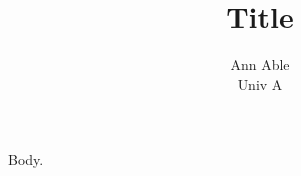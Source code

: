 \documentclass{article}
\title{Title}
\author{Ann Able\\ Univ A\\ \email{ann@able.org}}
\begin{document}
\maketitle
Body.
\end{document}
